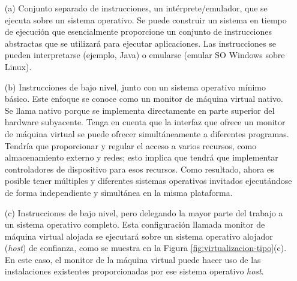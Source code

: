  
	\begin{enumerate}
		
		\item [(a)] Conjunto separado de instrucciones, un intérprete/emulador, que se ejecuta sobre un sistema operativo.
		Se puede construir un sistema en tiempo de ejecución que esencialmente proporcione un conjunto de instrucciones abstractas que se utilizará para ejecutar aplicaciones. Las instrucciones se pueden interpretarse (ejemplo, Java) o emularse  (emular SO Windows sobre Linux).
		
		\item [(b)] Instrucciones de bajo nivel, junto con un sistema operativo mínimo básico. 
		Este enfoque  se conoce como un monitor de máquina virtual nativo. Se llama nativo porque se implementa directamente en parte superior del hardware subyacente. Tenga en cuenta que la interfaz que ofrece un monitor de máquina virtual se puede ofrecer simultáneamente a diferentes programas. Tendría que proporcionar y regular el acceso
		a varios recursos, como almacenamiento externo y redes; esto implica que tendrá que implementar controladores de dispositivo para esos recursos. 		
		 Como resultado, ahora es posible tener múltiples y diferentes sistemas operativos invitados ejecutándose de forma independiente y simultánea en la misma plataforma.
		 
		
		
		\item [(c)] Instrucciones de bajo nivel, pero delegando la mayor parte del trabajo a un sistema operativo completo.	
		 Esta configuración llamada  monitor de máquina virtual alojada se ejecutará sobre un sistema operativo alojador (\textit{host}) de confianza, como se muestra en la Figura \ref{fig:virtualizacion-tipo}(c). En este caso, el monitor de la máquina virtual puede hacer uso de las instalaciones existentes proporcionadas por ese sistema operativo \textit{host}.
		
		
		
	\end{enumerate}
	
 
